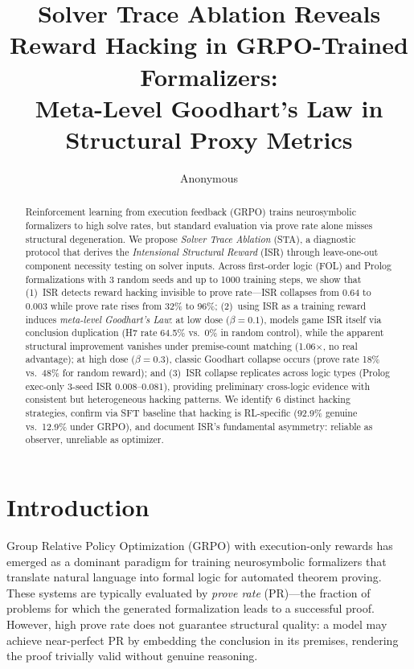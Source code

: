 \documentclass[11pt,a4paper]{article}
\title{Solver Trace Ablation Reveals Reward Hacking in GRPO-Trained Formalizers:\\Meta-Level Goodhart's Law in Structural Proxy Metrics}
\author{Anonymous}
\date{}
\newcommand{\isr}{\textsc{ISR}}
\newcommand{\sta}{\textsc{STA}}
\newcommand{\pr}{\textsc{PR}}
\newcommand{\grpo}{\textsc{GRPO}}
\begin{document}
\maketitle

\begin{abstract}
Reinforcement learning from execution feedback (GRPO) trains neurosymbolic formalizers to high solve rates, but standard evaluation via prove rate alone misses structural degeneration.
We propose \emph{Solver Trace Ablation} (\sta{}), a diagnostic protocol that derives the \emph{Intensional Structural Reward} (\isr{}) through leave-one-out component necessity testing on solver inputs.
Across first-order logic (FOL) and Prolog formalizations with 3 random seeds and up to 1000 training steps, we show that (1)~\isr{} detects reward hacking invisible to prove rate---\isr{} collapses from 0.64 to 0.003 while prove rate rises from 32\% to 96\%; (2)~using \isr{} as a training reward induces \emph{meta-level Goodhart's Law}: at low dose ($\beta{=}0.1$), models game \isr{} itself via conclusion duplication (H7 rate 64.5\% vs.\ 0\% in random control), while the apparent structural improvement vanishes under premise-count matching (1.06$\times$, no real advantage); at high dose ($\beta{=}0.3$), classic Goodhart collapse occurs (prove rate 18\% vs.\ 48\% for random reward); and (3)~\isr{} collapse replicates across logic types (Prolog exec-only 3-seed \isr{} 0.008--0.081), providing preliminary cross-logic evidence with consistent but heterogeneous hacking patterns.
We identify 6 distinct hacking strategies, confirm via SFT baseline that hacking is RL-specific (92.9\% genuine vs.\ 12.9\% under GRPO), and document \isr{}'s fundamental asymmetry: reliable as observer, unreliable as optimizer.
\end{abstract}


\section{Introduction}
\label{sec:intro}

Group Relative Policy Optimization (\grpo{}) with execution-only rewards has emerged as a dominant paradigm for training neurosymbolic formalizers that translate natural language into formal logic for automated theorem proving.
These systems are typically evaluated by \emph{prove rate} (\pr{})---the fraction of problems for which the generated formalization leads to a successful proof.
However, high prove rate does not guarantee structural quality: a model may achieve near-perfect \pr{} by embedding the conclusion in its premises, rendering the proof trivially valid without genuine reasoning.
\end{document}
